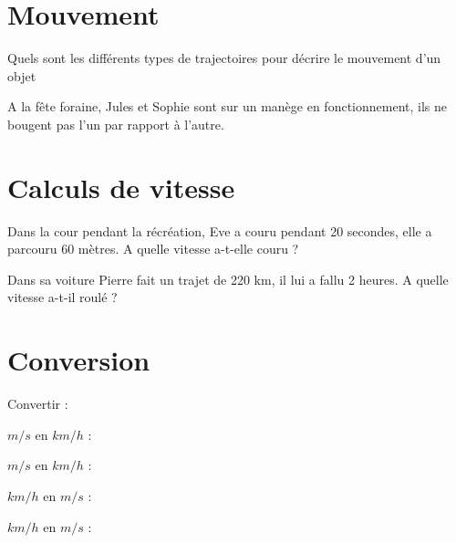 


\section{Mouvement}

\begin{questions}
	\question Quels sont les différents types de trajectoires pour décrire le mouvement d'un objet
	\fillwithdottedlines{2cm}
	
	\question A la fête foraine, Jules et Sophie sont sur un manège en fonctionnement, ils ne bougent pas l'un par rapport à l'autre.
	
	
\end{questions}



\section{Calculs de vitesse}

\begin{questions}
	
	\question Dans la cour pendant la récréation, Eve a couru pendant 20 secondes, elle a parcouru 60 mètres. A quelle vitesse a-t-elle couru ?
	\fillwithdottedlines{3cm}
	
	
	\question Dans sa voiture Pierre fait un trajet de 220 km, il lui a fallu 2 heures. A quelle vitesse a-t-il roulé ?
	\fillwithdottedlines{3cm}
		
\end{questions}

\newpage

\section{Conversion}

Convertir :
\begin{questions}
	 $m/s$ en $km/h$ :
	\fillwithdottedlines{2cm}
	
	 $m/s$ en $km/h$ :
	\fillwithdottedlines{2cm}
	
	 $km/h$ en $m/s$ :
	\fillwithdottedlines{2cm}
	
	 $km/h$ en $m/s$ :
	\fillwithdottedlines{2cm}
\end{questions}
